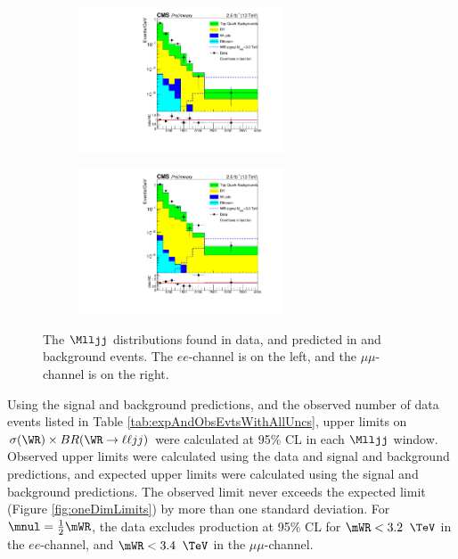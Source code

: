 \begin{figure}
	\centering
	\begin{subfigure}[t]{2.4in}
		\centering
		\includegraphics[width=2.4in]{figures/Mlljj_2012Bins_MWR3000Signal_SignalRegion_EEChannelBkgndMC_DYMadHTAndIncl_TTBarFromData_WithUnblindedData_withRatio_log.pdf}
	\end{subfigure}
	\thickspace
	\begin{subfigure}[t]{2.4in}
		\centering
		\includegraphics[width=2.4in]{figures/Mlljj_2012Bins_MWR3000Signal_SignalRegion_MuMuChannelBkgndMC_DYMadHTAndIncl_TTBarFromData_WithUnblindedData_withRatio_log.pdf}
	\end{subfigure}
	\caption{The $\Mlljj$ distributions found in data, and predicted in \WR and background events.  The $ee$-channel is 
	on the left, and the $\mu\mu$-channel is on the right.}
	\label{fig:obsAndExpMlljj}
\end{figure}

Using the signal and background predictions, and the observed number of data events listed in Table \ref{tab:expAndObsEvtsWithAllUncs}, upper 
limits on $\sigma(\WR) \times BR(\WR \rightarrow \ell\ell jj)$ were calculated at 95\% CL in each $\Mlljj$ window.  Observed upper limits 
were calculated using the data and signal and background predictions, and expected upper limits were calculated using the signal and 
background predictions.  The observed limit never exceeds the expected limit (Figure \ref{fig:oneDimLimits}) by more than one standard deviation.  
For $\mnul = \frac{1}{2}\mWR$, the data excludes \WR production at 95\% CL for $\mWR < 3.2$ $\TeV$ in the $ee$-channel, and $\mWR < 3.4$ $\TeV$ 
in the $\mu\mu$-channel.

